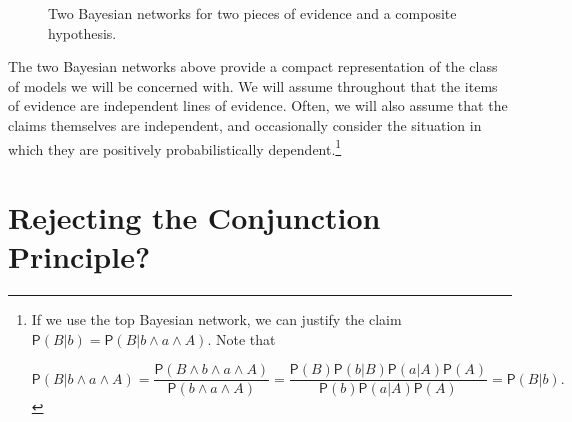 \documentclass[10pt,dvipsnames,enabledeprecatedfontcommands]{scrartcl}
\newcommand{\pr}[1]{\mathsf{P}(#1)}
\begin{document}
\begin{center}
\begin{figure}[h!]

\caption{Two Bayesian networks for two pieces of evidence and a composite hypothesis.}
\label{network-conjunction}
\end{figure}
\end{center}

The two Bayesian networks above provide a compact representation of the
class of models we will be concerned with. We will assume throughout
that the items of evidence are independent lines of evidence. Often, we
will also assume that the claims themselves are independent, and
occasionally consider the situation in which they are positively
probabilistically
dependent.\footnote{If we use the top Bayesian network, we can justify the claim
$\pr{B \vert b}=\pr{B \vert b \wedge a \wedge A}$. Note that 

\[\pr{B \vert b \wedge a \wedge A}= \frac{\pr{B \wedge b \wedge a \wedge A}}{\pr{b \wedge a \wedge A}}
=\frac{\pr{B}\pr{b\vert B}\pr{a \vert A} \pr{A}}{\pr{b} \pr{a \vert A}\pr{A}}=\pr{B \vert b}.\]

}

\hypertarget{rejecting-the-conjunction-principle}{%
\section{Rejecting the Conjunction
Principle?}\label{rejecting-the-conjunction-principle}}
\end{document}
